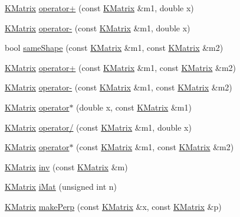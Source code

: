 \begin{DoxyCompactItemize}
\item 
\hyperlink{class_k_base_1_1_k_matrix}{K\-Matrix} \hyperlink{namespace_k_base_ac2f6fb159524c6aac11862ca87f92e38}{operator+} (const \hyperlink{class_k_base_1_1_k_matrix}{K\-Matrix} \&m1, double x)
\item 
\hyperlink{class_k_base_1_1_k_matrix}{K\-Matrix} \hyperlink{namespace_k_base_adb518e5ec363db77bedda0c18e1fd64a}{operator-\/} (const \hyperlink{class_k_base_1_1_k_matrix}{K\-Matrix} \&m1, double x)
\item 
bool \hyperlink{namespace_k_base_a15fc032589db73d1d60588d47ffd9b05}{same\-Shape} (const \hyperlink{class_k_base_1_1_k_matrix}{K\-Matrix} \&m1, const \hyperlink{class_k_base_1_1_k_matrix}{K\-Matrix} \&m2)
\item 
\hyperlink{class_k_base_1_1_k_matrix}{K\-Matrix} \hyperlink{namespace_k_base_a7734f1e897f145bba23366bd973c0263}{operator+} (const \hyperlink{class_k_base_1_1_k_matrix}{K\-Matrix} \&m1, const \hyperlink{class_k_base_1_1_k_matrix}{K\-Matrix} \&m2)
\item 
\hyperlink{class_k_base_1_1_k_matrix}{K\-Matrix} \hyperlink{namespace_k_base_a9d58d169c4a4e5efff74c172b82c4706}{operator-\/} (const \hyperlink{class_k_base_1_1_k_matrix}{K\-Matrix} \&m1, const \hyperlink{class_k_base_1_1_k_matrix}{K\-Matrix} \&m2)
\item 
\hyperlink{class_k_base_1_1_k_matrix}{K\-Matrix} \hyperlink{namespace_k_base_a372e3be66ffb5cd9e50b3200ba97f380}{operator$\ast$} (double x, const \hyperlink{class_k_base_1_1_k_matrix}{K\-Matrix} \&m1)
\item 
\hyperlink{class_k_base_1_1_k_matrix}{K\-Matrix} \hyperlink{namespace_k_base_a58ef09420d60415eaceff0b5ee327816}{operator/} (const \hyperlink{class_k_base_1_1_k_matrix}{K\-Matrix} \&m1, double x)
\item 
\hyperlink{class_k_base_1_1_k_matrix}{K\-Matrix} \hyperlink{namespace_k_base_a23533e6ca4a878e4c7cda5c2a8f64b8c}{operator$\ast$} (const \hyperlink{class_k_base_1_1_k_matrix}{K\-Matrix} \&m1, const \hyperlink{class_k_base_1_1_k_matrix}{K\-Matrix} \&m2)
\item 
\hyperlink{class_k_base_1_1_k_matrix}{K\-Matrix} \hyperlink{namespace_k_base_a51871fc212c85456613b0400a23b65b5}{inv} (const \hyperlink{class_k_base_1_1_k_matrix}{K\-Matrix} \&m)
\item 
\hyperlink{class_k_base_1_1_k_matrix}{K\-Matrix} \hyperlink{namespace_k_base_a0077eeff20727c6d51dab5e9652dd72c}{i\-Mat} (unsigned int n)
\item 
\hyperlink{class_k_base_1_1_k_matrix}{K\-Matrix} \hyperlink{namespace_k_base_a4851e8a724ef8136aefd7c3e5cb3ced7}{make\-Perp} (const \hyperlink{class_k_base_1_1_k_matrix}{K\-Matrix} \&x, const \hyperlink{class_k_base_1_1_k_matrix}{K\-Matrix} \&p)

\end{DoxyCompactItemize}
